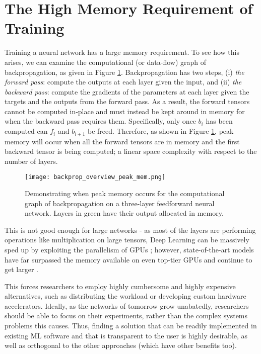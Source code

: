 \section*{The High Memory Requirement of Training}
Training a neural network has a large memory requirement. To see how this arises, we can examine the computational (or data-flow) graph of backpropagation, as given in Figure \ref{fig:1-backprop-peak-mem}. Backpropagation has two steps, (i) \textit{the forward pass}: compute the outputs at each layer given the input, and (ii) \textit{the backward pass}: compute the gradients of the parameters at each layer given the targets and the outputs from the forward pass. As a result, the forward tensors cannot be computed in-place and must instead be kept around in memory for when the backward pass requires them. Specifically, only once \(b_i\) has been computed can \(f_i\) and \(b_{i+1}\) be freed. Therefore, as shown in Figure \ref{fig:1-backprop-peak-mem}, peak memory will occur when all the forward tensors are in memory and the first backward tensor is being computed; a linear space complexity with respect to the number of layers.

\begin{figure}[t]
    \centering
    \texttt{[image: backprop\_overview\_peak\_mem.png]}
    \caption{Demonstrating when peak memory occurs for the computational graph of backpropagation on a three-layer feedforward neural network. Layers in green have their output allocated in memory.}
    \label{fig:1-backprop-peak-mem}
\end{figure}

This is not good enough for large networks - as most of the layers are performing operations like multiplication on large tensors, Deep Learning can be massively sped up by exploiting the parallelism of GPUs \cite{Kayid2018, Scanzio2010, Dogaru2017}; however, state-of-the-art models have far surpassed the memory available on even top-tier GPUs and continue to get larger \cite{Huang2017-densenet,Szegedy2015-inception,He2016-resnet}.

This forces researchers to employ highly cumbersome and highly expensive alternatives, such as distributing the workload or developing custom hardware accelerators. Ideally, as the networks of tomorrow grow unabatedly, researchers should be able to focus on their experiments, rather than the complex systems problems this causes. Thus, finding a solution that can be readily implemented in existing ML software and that is transparent to the user is highly desirable, as well as orthogonal to the other approaches (which have other benefits too).

